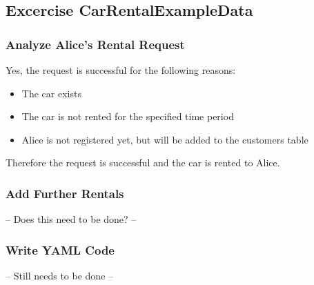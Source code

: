 \subsection{Excercise CarRentalExampleData}
\label{sec:exercise_car_rental_example_data}
\subsubsection*{Analyze Alice's Rental Request}
Yes, the request is successful for the following reasons:
\begin{itemize}
    \item The car exists
    \item The car is not rented for the specified time period
    \item Alice is not registered yet, but will be added to the customers table
\end{itemize}
Therefore the request is successful and the car is rented to Alice.

\subsubsection*{Add Further Rentals}
-- Does this need to be done? --

\subsubsection*{Write YAML Code}
-- Still needs to be done --
